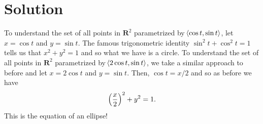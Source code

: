 \documentclass[11pt]{article}
\renewcommand{\R}{\mathbf{R}}
\begin{document}
\section*{Solution}
To understand the set of all points in $\R^2$ parametrized by $\!\left\langle\cos t,\sin t\right\rangle$, let $x=\cos t$ and $y=\sin t$. The famous trigonometric identity $\sin^2t+\cos^2t=1$ tells us that $x^2+y^2=1$ and so what we have is a circle. To understand the set of all points in $\R^2$ parametrized by $\!\left\langle2\cos t,\sin t\right\rangle$, we take a similar approach to before and let $x=2\cos t$ and $y=\sin t$. Then, $\cos t=x/2$ and so as before we have 
$$\left(\dfrac{x}{2}\right)^2+y^2=1.$$
This is the equation of an ellipse!
\end{document}
